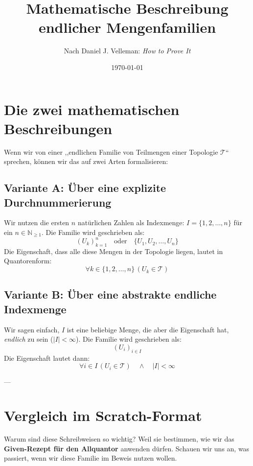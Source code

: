 \documentclass{article}
\title{Mathematische Beschreibung endlicher Mengenfamilien}
\author{Nach Daniel J. Velleman: \emph{How to Prove It}}
\date{\today}
\begin{document}
\maketitle

\section*{Die zwei mathematischen Beschreibungen}

Wenn wir von einer ,,endlichen Familie von Teilmengen einer Topologie $\mathcal{T}$`` sprechen, können wir das auf zwei Arten formalisieren:

\subsection*{Variante A: Über eine explizite Durchnummerierung}
Wir nutzen die ersten $n$ natürlichen Zahlen als Indexmenge: $I = \{1, 2, \dots, n\}$ für ein $n \in \mathbb{N}_{\ge 1}$.
Die Familie wird geschrieben als:
\[
(U_k)_{k=1}^n \quad \text{oder} \quad \{U_1, U_2, \dots, U_n\}
\]
Die Eigenschaft, dass alle diese Mengen in der Topologie liegen, lautet in Quantorenform:
\[
\forall k \in \{1, 2, \dots, n\} \, (U_k \in \mathcal{T})
\]

\subsection*{Variante B: Über eine abstrakte endliche Indexmenge}
Wir sagen einfach, $I$ ist eine beliebige Menge, die aber die Eigenschaft hat, \emph{endlich} zu sein ($|I| < \infty$).
Die Familie wird geschrieben als:
\[
(U_i)_{i \in I}
\]
Die Eigenschaft lautet dann:
\[
\forall i \in I \, (U_i \in \mathcal{T}) \quad \land \quad |I| < \infty
\]

---

\section*{Vergleich im Scratch-Format}

Warum sind diese Schreibweisen so wichtig? Weil sie bestimmen, wie wir das \textbf{Given-Rezept für den Allquantor} anwenden dürfen. Schauen wir uns an, was passiert, wenn wir diese Familie im Beweis nutzen wollen.
\end{document}
